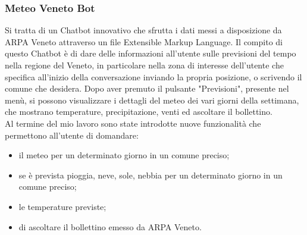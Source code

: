 \subsubsection{Meteo Veneto Bot}
Si tratta di un \gls{Chatbot} innovativo che sfrutta i dati messi a disposizione da ARPA Veneto attraverso un file \gls{Extensible Markup Language}. Il compito di questo  \gls{Chatbot} è di dare delle informazioni all'utente sulle previsioni del tempo nella regione del Veneto, in particolare nella zona di interesse dell'utente che specifica all'inizio della conversazione inviando la propria posizione, o scrivendo il comune che desidera. Dopo aver premuto il pulsante "Previsioni", presente nel menù, si possono visualizzare i dettagli del meteo dei vari giorni della settimana, che mostrano temperature, precipitazione, venti ed ascoltare il bollettino.\\
Al termine del mio lavoro sono state introdotte nuove funzionalità che permettono all'utente di domandare:
\begin{itemize}
	\item il meteo per un determinato giorno in un comune preciso;
	\item se è prevista pioggia, neve, sole, nebbia per un determinato giorno in un comune preciso;
	\item le temperature previste;
	\item di ascoltare il bollettino emesso da ARPA Veneto.
\end{itemize}

